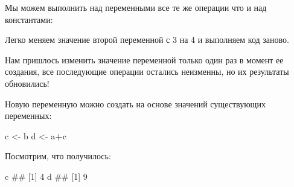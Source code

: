 \documentclass[]{book}
\newenvironment{Shaded}{\begin{snugshade}}{\end{snugshade}}
\newcommand{\DecValTok}[1]{\textcolor[rgb]{0.00,0.00,0.81}{#1}}
\newcommand{\StringTok}[1]{\textcolor[rgb]{0.31,0.60,0.02}{#1}}
\newcommand{\OperatorTok}[1]{\textcolor[rgb]{0.81,0.36,0.00}{\textbf{#1}}}
\newcommand{\NormalTok}[1]{#1}
\begin{document}
Мы можем выполнить над переменными все те же операции что и над
константами:

\begin{Shaded}
\end{Shaded}

Легко меняем значение второй переменной с 3 на 4 и выполняем код заново.

\begin{Shaded}
\end{Shaded}

Нам пришлось изменить значение переменной только один раз в момент ее
создания, все последующие операции остались неизменны, но их результаты
обновились!

Новую переменную можно создать на основе значений существующих
переменных:

\begin{Shaded}
\begin{Highlighting}[]
\NormalTok{c <-}\StringTok{ }\NormalTok{b}
\NormalTok{d <-}\StringTok{ }\NormalTok{a}\OperatorTok{+}\NormalTok{c}
\end{Highlighting}
\end{Shaded}

Посмотрим, что получилось:

\begin{Shaded}
\begin{Highlighting}[]
\NormalTok{c}
\NormalTok{## [1] 4}
\NormalTok{d}
\NormalTok{## [1] 9}
\end{Highlighting}
\end{Shaded}
\end{document}
